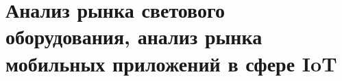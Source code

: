\section{Анализ рынка светового оборудования, анализ рынка мобильных приложений в сфере IoT}
\label{sec:analysis}

\subsection{}
\label{sec:analysis:model}


